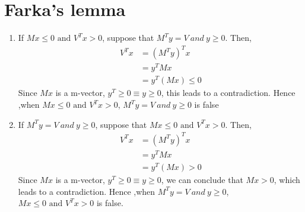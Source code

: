 \documentclass[12pt,a4paper]{article}
\theoremstyle{definition}
\begin{document}
\section{Farka’s lemma}
\begin{enumerate}
    \item If $M x \leq 0 \text { and } V^{T} x>0$, suppose that $M^{T} y=V\ and\ y \geq 0$. Then,
    \begin{align*}
        V^T x &= (M^T y)^T x \\
            &= y^TMx \\
            &=y^T(Mx) \leq 0 
    \end{align*}
    Since $Mx$ is a m-vector, $y^T\geq 0 \equiv y \geq 0$, this leads to a contradiction. Hence ,when $M x \leq 0 \text { and } V^{T} x>0$, $M^{T} y=V\ and\ y \geq 0$ is false
    \item If $M^{T} y=V\ and\ y \geq 0$, suppose that $M x \leq 0 \text { and } V^{T} x>0$. Then,
    \begin{align*}
        V^T x &= (M^T y)^T x \\
            &= y^TMx \\
            &=y^T(Mx) > 0 
    \end{align*}
    Since $Mx$ is a m-vector, $y^T\geq 0 \equiv y \geq 0$, we can conclude that $Mx > 0$, which leads to a contradiction.
    Hence ,when $M^{T} y=V\ and\ y \geq 0$, $M x \leq 0 \text { and } V^{T} x>0$ is false.
\end{enumerate}
\end{document}
